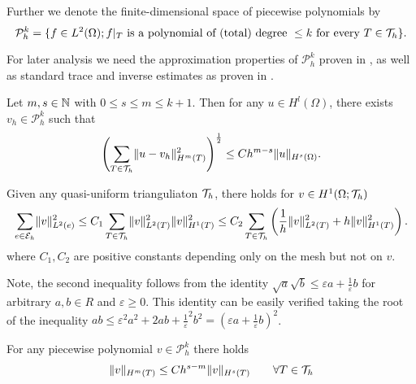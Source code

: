 \begin{definition} \label{def: piecewise polySpace}
	Further we denote the finite-dimensional space of piecewise polynomials by
\[	
	\mathcal P^k_h = \{ f \in L^2(\Omega); f \arrowvert_T \textnormal{ is a polynomial of (total) degree } \leq k \textnormal{ for every } T \in \mathcal{T}_h\}.
\]
\end{definition}

For later analysis we need the approximation properties of $\mathcal P_h^k$ proven in \cite[Chapter 4]{BS2002}, as well as standard trace and inverse estimates as proven in \cite[Section 1.6 and Section 4.5]{BS2002}.
\begin{lemma}  \label{la: approximation properties}
Let $m,s \in \mathbb{N}$ with $0 \leq s \leq m\leq k+1$. Then for any $u \in H^l(\Omega)$, there exists $v_h \in \mathcal P^k_h$ such that 
\[
	\left( \sum_{T \in \mathcal{T}_h} \lVert u-v_h \rVert^2_{H^m(T)} \right)^{\frac 1 2} \leq C h^{m-s} \lVert u \rVert_{H^{s}(\Omega)}.
\]
\end{lemma}
\begin{lemma}\label{la: trace estimate}
	Given any quasi-uniform trianguliaton $\mathcal{T}_h$, there holds for $ v \in H^1(\Omega;\mathcal{T}_h)$
	\begin{align*}
	\sum_{e \in \mathcal{E}_h} \lVert v \rVert_{L^2(e)}^2 
		\leq C_1
		 \sum_{T \in \mathcal{T}_h} \lVert v \rVert_{L^2(T)}^2 \lVert v \rVert_{H^1(T)}^2
	\leq 
		C_2 \sum_{T \in \mathcal{T}_h} \left(\frac 1 {h} \lVert v \rVert_{L^2(T)}^2  + h \lVert v \rVert_{H^1(T)}^2\right).
	\end{align*}
	 where $C_1,C_2$ are positive constants depending only on the mesh but not on $v$.
\end{lemma}
Note, the second inequality follows from the identity $\sqrt{a} \sqrt{b} \leq \varepsilon a + \frac 1 \varepsilon b$ for arbitrary $a,b \in R$ and $\varepsilon \geq 0$. This identity can be easily verified taking the root of the inequality $ab \leq \varepsilon^2 a^2 + 2ab + {\frac 1 \varepsilon}^2b^2 = \left( \varepsilon a + \frac 1 \varepsilon b\right)^2$.

\begin{lemma}\label{la: inverse estimate}
	For any piecewise polynomial $v \in \mathcal P_h^k$ there holds
	\[
	\lVert v \rVert_{H^m(T)} \leq C h^{s-m} \lVert v \rVert_{H^s(T)} \qquad \forall T \in \mathcal{T}_h
	\]
\end{lemma}

